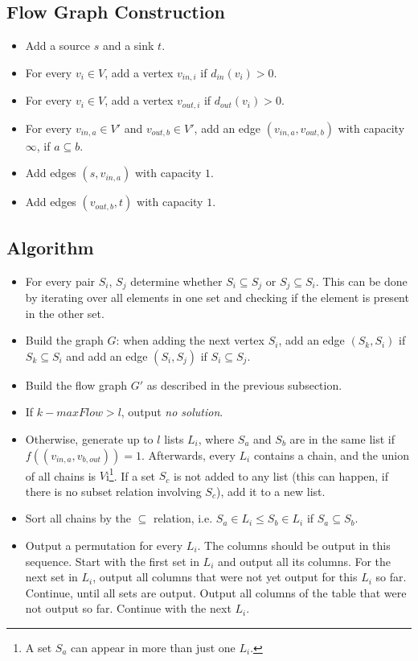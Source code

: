 \documentclass[12pt]{article}
\begin{document}
\subsection*{Flow Graph Construction}
\begin{itemize}
	\item Add a source $s$ and a sink $t$.
	\item For every $v_i \in V$, add a vertex $v_{\mathit{in},i}$ if $d_\mathit{in}(v_i) > 0$.
	\item For every $v_i \in V$, add a vertex $v_{\mathit{out},i}$ if $d_\mathit{out}(v_i) > 0$.
	\item For every $v_{\mathit{in},a} \in V'$ and $v_{\mathit{out},b} \in V'$, add an edge $(v_{\mathit{in},a}, v_{\mathit{out},b})$ with capacity $\infty$, if $a \subseteq b$.
	\item Add edges $(s, v_{\mathit{in},a})$ with capacity $1$.
	\item Add edges $(v_{\mathit{out},b},t)$ with capacity $1$.
\end{itemize}

\subsection*{Algorithm}
\begin{itemize}
	\item For every pair $S_i$, $S_j$ determine whether $S_i \subseteq S_j$ or $S_j\subseteq S_i$. This can be done by iterating over all elements in one set and checking if the element is present in the other set.
	\item Build the graph $G$: when adding the next vertex $S_i$, add an edge $(S_k, S_i)$ if $S_k \subseteq S_i$ and add an edge $(S_i, S_j)$ if $S_i \subseteq S_j$.
	\item Build the flow graph $G'$ as described in the previous subsection.
	\item If $k-\mathit{maxFlow} > l$, output \emph{no solution}.
	\item Otherwise, generate up to $l$ lists $L_i$, where $S_a$ and $S_b$ are in the same list if $f((v_{\mathit{in},a}, v_{b, \mathit{out}})) = 1$. Afterwards, every $L_i$ contains a chain, and the union of all chains is $V$i\footnote{A set $S_a$ can appear in more than just one $L_i$.}. If a set $S_c$ is not added to any list (this can happen, if there is no subset relation involving $S_c$), add it to a new list.
	\item Sort all chains by the $\subseteq$ relation, i.e. $S_a \in L_i \leq S_b \in L_i$ if $S_a \subseteq S_b$.
	\item Output a permutation for every $L_i$. The columns should be output in this sequence. Start with the first set in $L_i$ and output all its columns. For the next set in $L_i$, output all columns that were not yet output for this $L_i$ so far. Continue, until all sets are output. Output all columns of the table that were not output so far. Continue with the next $L_i$.
\end{itemize}
\end{document}
